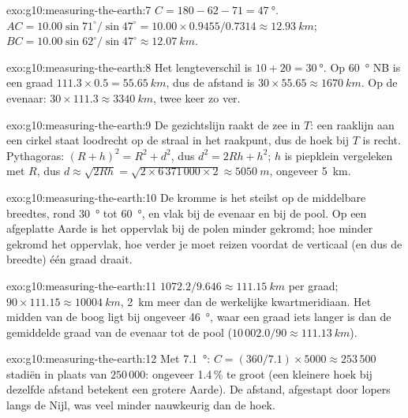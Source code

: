 \begin{solution}{exo:g10:measuring-the-earth:7}
$C = 180 - 62 - 71 = \qty{47}{\degree}$.
$AC = 10.00 \sin 71^\circ/\sin 47^\circ = 10.00 \times 0.9455/0.7314 \approx
\qty{12.93}{km}$; $BC = 10.00 \sin 62^\circ/\sin 47^\circ \approx
\qty{12.07}{km}$.
\end{solution}

\begin{solution}{exo:g10:measuring-the-earth:8}
Het lengteverschil is $10 + 20 = \qty{30}{\degree}$. Op
\qty{60}{\degree} NB is een graad $111.3 \times 0.5 = \qty{55.65}{km}$, dus de
afstand is $30 \times 55.65 \approx \qty{1670}{km}$. Op de evenaar:
$30 \times 111.3 \approx \qty{3340}{km}$, twee keer zo ver.
\end{solution}

\begin{solution}{exo:g10:measuring-the-earth:9}
De gezichtslijn raakt de zee in $T$: een raaklijn aan een cirkel staat loodrecht
op de straal in het raakpunt, dus de hoek bij $T$ is recht. Pythagoras:
$(R+h)^2 = R^2 + d^2$, dus $d^2 = 2Rh + h^2$; $h$ is piepklein vergeleken met
$R$, dus $d \approx \sqrt{2Rh} = \sqrt{2 \times
6\,371\,000 \times 2} \approx \qty{5050}{m}$, ongeveer \qty{5}{km}.
\end{solution}

\begin{solution}{exo:g10:measuring-the-earth:10}
De kromme is het steilst op de middelbare breedtes, rond \qty{30}{\degree} tot
\qty{60}{\degree}, en vlak bij de evenaar en bij de pool. Op een afgeplatte
Aarde is het oppervlak bij de polen minder gekromd; hoe minder gekromd het
oppervlak, hoe verder je moet reizen voordat de verticaal (en dus de breedte)
één graad draait.
\end{solution}

\begin{solution}{exo:g10:measuring-the-earth:11}
$1072.2/9.646 \approx \qty{111.15}{km}$ per graad; $90 \times 111.15
\approx \qty{10004}{km}$, \qty{2}{km} meer dan de werkelijke kwartmeridiaan.
Het midden van de boog ligt bij ongeveer \qty{46}{\degree}, waar een graad iets
langer is dan de gemiddelde graad van de evenaar tot de pool
($10\,002.0/90 \approx \qty{111.13}{km}$).
\end{solution}

\begin{solution}{exo:g10:measuring-the-earth:12}
Met \qty{7.1}{\degree}: $C = (360/7.1) \times 5000 \approx 253\,500$ stadiën
in plaats van $250\,000$: ongeveer 1.4\,\% te groot (een kleinere hoek bij
dezelfde afstand betekent een grotere Aarde). De afstand, afgestapt door lopers
langs de Nijl, was veel minder nauwkeurig dan de hoek.
\end{solution}

